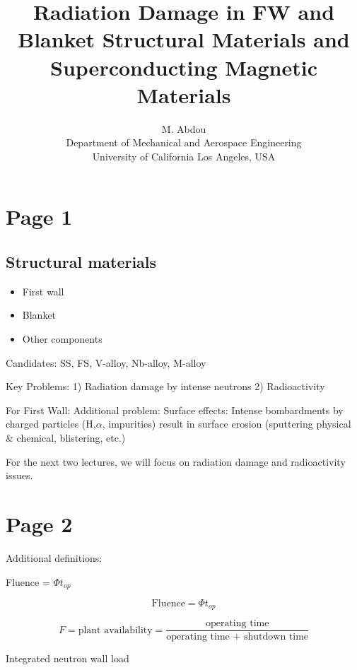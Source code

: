 \documentclass[11pt]{article}
\begin{document}
\doublespacing
\title{Radiation Damage in FW and Blanket Structural Materials and Superconducting Magnetic Materials}
\author{M. Abdou \\
Department of Mechanical and Aerospace Engineering \\
University of California Los Angeles, USA\\
}
\maketitle

\section{Page 1}
\subsection{Structural materials}
\begin{itemize}
\item First wall
\item Blanket
\item Other components
\end{itemize}
Candidates: SS, FS, V-alloy, Nb-alloy, M-alloy

Key Problems:
1) Radiation damage by intense neutrons
2) Radioactivity

For First Wall:
Additional problem:
Surface effects: Intense bombardments by charged particles (H,$\alpha$, impurities) result in surface erosion (sputtering physical \& chemical, blistering, etc.)

For the next two lectures, we will focus on radiation damage and radioactivity issues.

\section{Page 2}
Additional definitions:

Fluence = $\Phi t_{op}$

\begin{equation}
	\text{Fluence} = \Phi t_{op}
\end{equation}

\begin{equation}
	F = \text{plant availability} = \frac{\text{operating time}}{\text{operating time + shutdown time}}
\end{equation}

Integrated neutron wall load
\end{document}
